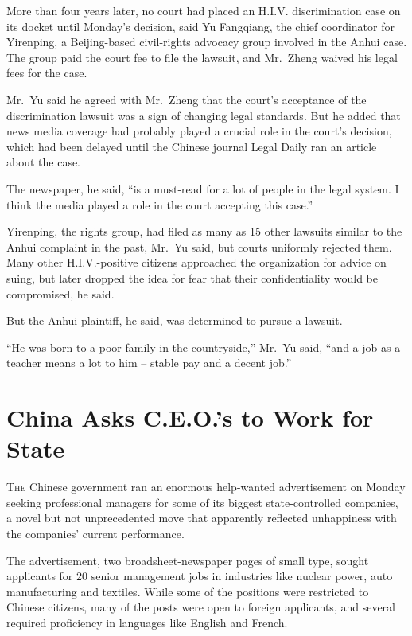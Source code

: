 ﻿\documentclass[12pt]{article}
\begin{document}
More than four years later, no court had placed an H.I.V. discrimination case on its docket until
Monday's decision, said Yu Fangqiang, the chief coordinator for Yirenping, a Beijing-based
civil-rights advocacy group involved in the Anhui case. The group paid the court fee to file the
lawsuit, and Mr.~Zheng waived his legal fees for the case.

Mr.~Yu said he agreed with Mr.~Zheng that the court's acceptance of the discrimination lawsuit was a
sign of changing legal standards. But he added that news media coverage had probably played a
crucial role in the court's decision, which had been delayed until the Chinese journal Legal Daily
ran an article about the case.

The newspaper, he said, ``is a must-read for a lot of people in the legal system. I think the media
played a role in the court accepting this case.''

Yirenping, the rights group, had filed as many as 15 other lawsuits similar to the Anhui complaint
in the past, Mr.~Yu said, but courts uniformly rejected them. Many other H.I.V.-positive citizens
approached the organization for advice on suing, but later dropped the idea for fear that their
confidentiality would be compromised, he said.

But the Anhui plaintiff, he said, was determined to pursue a lawsuit.

``He was born to a poor family in the countryside,'' Mr.~Yu said, ``and a job as a teacher means a
lot to him -- stable pay and a decent job.''

\pagebreak
\section{China Asks C.E.O.'s to Work for State}

\lettrine{T}{he} Chinese government ran an enormous help-wanted
advertisement on Monday seeking professional managers for some of its biggest state-controlled
companies, a novel but not unprecedented move that apparently reflected unhappiness with the
companies' current performance.

The advertisement, two broadsheet-newspaper pages of small type, sought applicants for 20 senior
management jobs in industries like nuclear power, auto manufacturing and textiles. While some of the
positions were restricted to Chinese citizens, many of the posts were open to foreign applicants,
and several required proficiency in languages like English and French.
\end{document}
